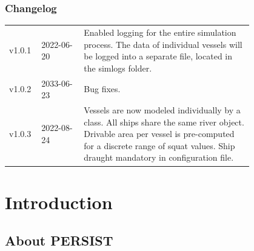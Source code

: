 \documentclass[
	a4paper, %
	12pt, %
]{persist}
\begin{document}
\begin{twothirdswidth}
	\vfill %
	
	\subsubsection*{Changelog}
	
	\scriptsize %
	
	\begin{tabular}{@{} L{0.05\linewidth} L{0.15\linewidth} L{0.6\linewidth} @{}} %
		\toprule
		v1.0.1 & 2022-06-20 & Enabled logging for the entire simulation process. The data of individual vessels will be logged into a separate file, located in the simlogs folder.\\
		v1.0.2 & 2033-06-23 & Bug fixes.\\
		v1.0.3 & 2022-08-24 & Vessels are now modeled individually by a class. All ships share the same river object. Drivable area per vessel is pre-computed for a discrete range of squat values. Ship draught mandatory in configuration file.\\
		\bottomrule
	\end{tabular}
\end{twothirdswidth}

\newpage


\begin{twothirdswidth} %
	\tableofcontents %
\end{twothirdswidth}

\newpage

\section{Introduction} 

\subsection{About PERSIST} %
\end{document}
